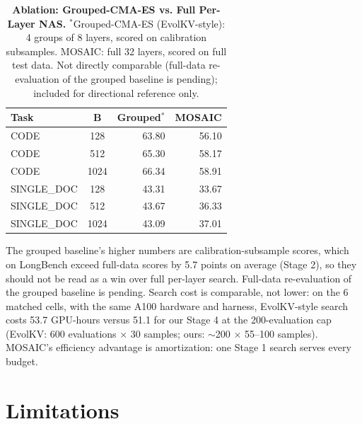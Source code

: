 \documentclass[11pt]{article}
\begin{document}
\begin{table}[t]
  \centering
  \small
  \setlength{\tabcolsep}{8pt}
  \begin{tabular}{@{} l c r r @{}}
    \toprule
    \textbf{Task} & \textbf{B} & \textbf{Grouped}$^*$ & \textbf{MOSAIC} \\
    \midrule
    \rowcolor{gray!10}
    CODE & 128 & 63.80 & 56.10 \\
    CODE & 512 & 65.30 & 58.17 \\
    \rowcolor{gray!10}
    CODE & 1024 & 66.34 & 58.91 \\
    SINGLE\_DOC & 128 & 43.31 & 33.67 \\
    \rowcolor{gray!10}
    SINGLE\_DOC & 512 & 43.67 & 36.33 \\
    SINGLE\_DOC & 1024 & 43.09 & 37.01 \\
    \bottomrule
  \end{tabular}
  \caption{\textbf{Ablation: Grouped-CMA-ES vs. Full Per-Layer NAS.} $^*$Grouped-CMA-ES (EvolKV-style): 4 groups of 8 layers, scored on calibration subsamples. MOSAIC: full 32 layers, scored on full test data. Not directly comparable (full-data re-evaluation of the grouped baseline is pending); included for directional reference only.}
  \label{tab:ablation}
\end{table}

The grouped baseline's higher numbers are calibration-subsample scores, which on LongBench exceed full-data scores by 5.7 points on average (Stage 2), so they should not be read as a win over full per-layer search. Full-data re-evaluation of the grouped baseline is pending. Search cost is comparable, not lower: on the 6 matched cells, with the same A100 hardware and harness, EvolKV-style search costs 53.7 GPU-hours versus 51.1 for our Stage 4 at the 200-evaluation cap (EvolKV: 600 evaluations $\times$ 30 samples; ours: $\sim$200 $\times$ 55--100 samples). MOSAIC's efficiency advantage is amortization: one Stage 1 search serves every budget.

\section{Limitations}
\end{document}
